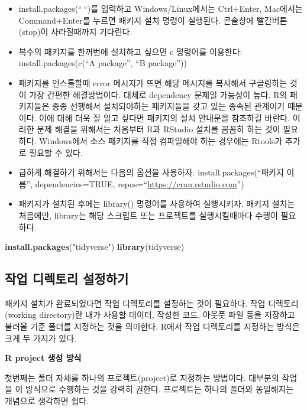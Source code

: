 \documentclass[
]{book}
\newenvironment{Shaded}{\begin{snugshade}}{\end{snugshade}}
\newcommand{\FunctionTok}[1]{\textcolor[rgb]{0.13,0.29,0.53}{\textbf{#1}}}
\newcommand{\NormalTok}[1]{#1}
\newcommand{\StringTok}[1]{\textcolor[rgb]{0.31,0.60,0.02}{#1}}
\providecommand{\tightlist}{%
  \setlength{\itemsep}{0pt}\setlength{\parskip}{0pt}}
\begin{document}
\begin{itemize}
\tightlist
\item
  install.packages(``\,``)를 입력하고 Windows/Linux에서는 Ctrl+Enter, Mac에서는 Command+Enter를 누르면 패키지 설치 명령이 실행된다. 콘솔창에 빨간버튼(stop)이 사라질때까지 기다린다.
\item
  복수의 패키지를 한꺼번에 설치하고 싶으면 c 명령어를 이용한다: install.packages(c(``A package'', ``B package''))
\item
  패키지를 인스톨할때 error 메시지가 뜨면 해당 메시지를 복사해서 구글링하는 것이 가장 간편한 해결방법이다. 대체로 dependency 문제일 가능성이 높다. R의 패키지들은 종종 선행해서 설치되야하는 패키지들을 갖고 있는 종속된 관계이기 때문이다. 이에 대해 더욱 잘 알고 싶다면 패키지의 설치 안내문을 참조하길 바란다. 이러한 문제 해결을 위해서는 처음부터 R과 RStudio 설치를 꼼꼼히 하는 것이 필요하다. Windows에서 소스 패키지를 직접 컴파일해야 하는 경우에는 Rtools가 추가로 필요할 수 있다.
\item
  급하게 해결하기 위해서는 다음의 옵션을 사용하자.
  install.packages(``패키지 이름'', dependencies=TRUE, repos=``\url{https://cran.rstudio.com}'')
\item
  패키지가 설치된 후에는 library() 명령어를 사용하여 실행시키자. 패키지 설치는 처음에만, library는 해당 스크립트 또는 프로젝트를 실행시킬때마다 수행이 필요하다.
\end{itemize}

\begin{Shaded}
\begin{Highlighting}[]
\FunctionTok{install.packages}\NormalTok{(}\StringTok{"tidyverse"}\NormalTok{)}
\FunctionTok{library}\NormalTok{(tidyverse)}
\end{Highlighting}
\end{Shaded}

\subsection{작업 디렉토리 설정하기}\label{uxc791uxc5c5-uxb514uxb809uxd1a0uxb9ac-uxc124uxc815uxd558uxae30}

패키지 설치가 완료되었다면 작업 디렉토리를 설정하는 것이 필요하다. 작업 디렉토리(working directory)란 내가 사용할 데이터, 작성한 코드, 아웃풋 파일 등을 저장하고 불러올 기준 폴더를 지정하는 것을 의미한다. R에서 작업 디렉토리를 지정하는 방식은 크게 두 가지가 있다.

\textbf{R project 생성 방식}

첫번째는 폴더 자체를 하나의 프로젝트(project)로 지정하는 방법이다. 대부분의 작업을 이 방식으로 수행하는 것을 강력히 권한다. 프로젝트는 하나의 폴더와 동일해지는 개념으로 생각하면 쉽다.
\end{document}
